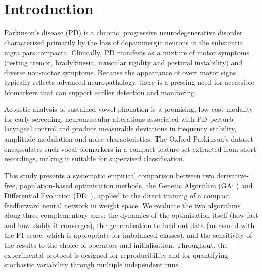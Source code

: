 \documentclass[12pt, a4paper]{article}
\begin{document}
\pagestyle{mainstyle}
\newpage
\tableofcontents
\newpage

\section{Introduction}

Parkinson's disease (PD) is a chronic, progressive neurodegenerative disorder characterised primarily by the loss of dopaminergic neurons in the substantia nigra pars compacta. Clinically, PD manifests as a mixture of motor symptoms (resting tremor, bradykinesia, muscular rigidity and postural instability) and diverse non-motor symptoms. Because the appearance of overt motor signs typically reflects advanced neuropathology, there is a pressing need for accessible biomarkers that can support earlier detection and monitoring.

Acoustic analysis of sustained vowel phonation is a promising, low-cost modality for early screening: neuromuscular alterations associated with PD perturb laryngeal control and produce measurable deviations in frequency stability, amplitude modulation and noise characteristics. The Oxford Parkinson's dataset \citep{little2009} encapsulates such vocal biomarkers in a compact feature set extracted from short recordings, making it suitable for supervised classification.


This study presents a systematic empirical comparison between two derivative-free, population-based optimisation methods, the Genetic Algorithm (GA; \citealp{goldberg1989}) and Differential Evolution (DE; \citealp{storn1997}), applied to the direct training of a compact feedforward neural network in weight space. We evaluate the two algorithms along three complementary axes: the dynamics of the optimisation itself (how fast and how stably it converges), the generalisation to held-out data (measured with the F1-score, which is appropriate for imbalanced classes), and the sensitivity of the results to the choice of operators and initialisation. Throughout, the experimental protocol is designed for reproducibility and for quantifying stochastic variability through multiple independent runs.
\end{document}
